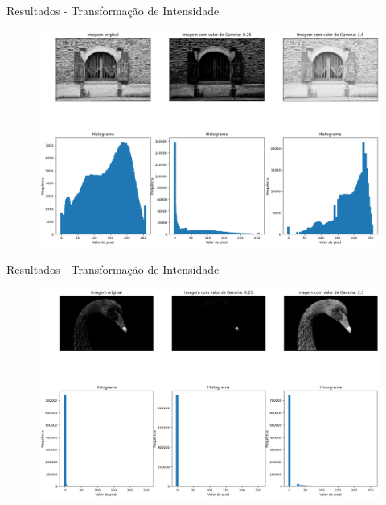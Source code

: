 \documentclass[]{beamer}
\begin{document}
\begin{frame}{Resultados - Transformação de Intensidade}
    \begin{figure}
        \includegraphics[scale=0.25]{Imagens/resultados-gamma-shutters.png}
    \end{figure}  
\end{frame}

\begin{frame}{Resultados - Transformação de Intensidade}
    \begin{figure}
        \includegraphics[scale=0.25]{Imagens/resultados-gamma-swam.png}
    \end{figure}  
\end{frame}
\end{document}
